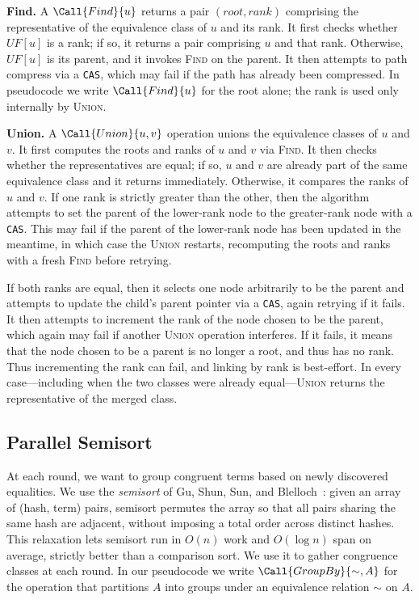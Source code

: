 \textbf{Find.} A $\Call{Find}{u}$ returns a pair $(\mathit{root},
\mathit{rank})$ comprising the representative of the equivalence class of $u$
and its rank. It first checks whether $\mathit{UF}[u]$ is a rank; if so, it
returns a pair comprising $u$ and that rank. Otherwise, $\mathit{UF}[u]$ is its
parent, and it invokes \textsc{Find} on the parent. It then attempts to path
compress via a \texttt{CAS}, which may fail if the path has already been
compressed. In pseudocode we write $\Call{Find}{u}$ for the root alone; the
rank is used only internally by \textsc{Union}.

\textbf{Union.} A $\Call{Union}{u, v}$ operation unions the equivalence classes
of $u$ and $v$. It first computes the roots and ranks of $u$ and $v$ via
\textsc{Find}. It then checks whether the representatives are equal; if so, $u$
and $v$ are already part of the same equivalence class and it returns
immediately. Otherwise, it compares the ranks of $u$ and $v$. If one rank is
strictly greater than the other, then the algorithm attempts to set the parent
of the lower-rank node to the greater-rank node with a \texttt{CAS}. This may
fail if the parent of the lower-rank node has been updated in the meantime, in
which case the \textsc{Union} restarts, recomputing the roots and ranks with a
fresh \textsc{Find} before retrying.

If both ranks are equal, then it selects one node arbitrarily to be the parent
and attempts to update the child's parent pointer via a \texttt{CAS}, again
retrying if it fails. It then attempts to increment the rank of the node chosen
to be the parent, which again may fail if another \textsc{Union} operation
interferes. If it fails, it means that the node chosen to be a parent is no
longer a root, and thus has no rank. Thus incrementing the rank can fail, and
linking by rank is best-effort. In every case---including when the two classes
were already equal---\textsc{Union} returns the representative of the merged
class.

\subsection{Parallel Semisort}
\label{subsec:semisort}

At each round, we want to group congruent terms based on newly discovered
equalities. We use the \emph{semisort} of Gu, Shun, Sun, and
Blelloch~\cite{semisort}: given an array of (hash, term) pairs, semisort
permutes the array so that all pairs sharing the same hash are adjacent,
without imposing a total order across distinct hashes. This relaxation lets
semisort run in $O(n)$ work and $O(\log n)$ span on average, strictly
better than a comparison sort. We use it to gather congruence classes at
each round. In our pseudocode we write $\Call{GroupBy}{\sim, A}$ for the
operation that partitions $A$ into groups under an equivalence relation
$\sim$ on $A$.

